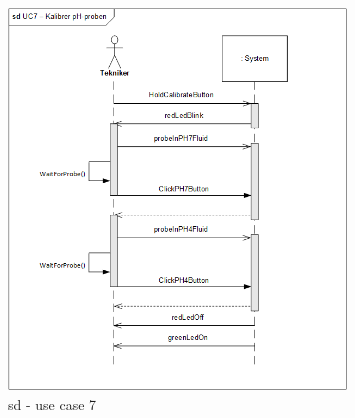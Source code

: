 \begin{figure}[H]
    \centering
    \includegraphics[width=0.8\textwidth]{Systemarkitektur/OverordnedeSekvensdiagrammer/sd_UC7.PNG}
    \caption{sd - use case 7}
    \label{fig:sd_UC6}
\end{figure}